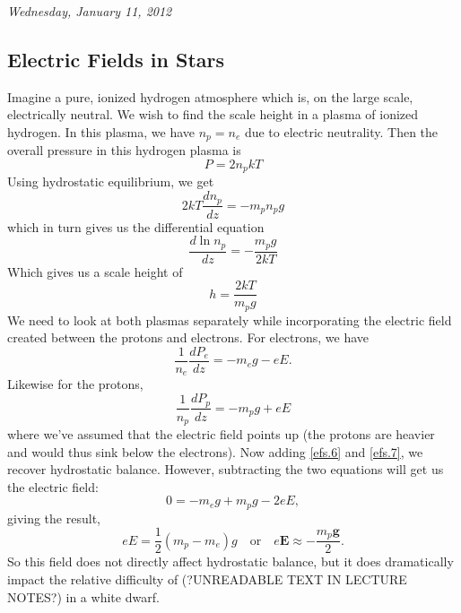\documentclass[10pt]{article}
\numberwithin{equation}{section}
\newcommand{\n}{\noindent}
\begin{document}
	\n \textit{Wednesday, January 11, 2012}
	\subsection{Electric Fields in Stars}
	Imagine a pure, ionized hydrogen atmosphere which is, on the large scale, electrically neutral. We wish to find the scale height in a plasma of ionized hydrogen. In this plasma, we have $n_p=n_e$ due to electric neutrality. Then the overall pressure in this hydrogen plasma is
	\begin{equation}
		\label{efs.2} P=2n_pkT
	\end{equation}
	Using hydrostatic equilibrium, we get
	\begin{equation}
		\label{efs.3} 2kT\frac{dn_p}{dz}=-m_pn_pg
	\end{equation}
	which in turn gives us the differential equation
	\begin{equation}
		\label{efs.4} \frac{d\ln n_p}{dz}=-\frac{m_pg}{2kT}
	\end{equation}
	Which gives us a scale height of
	\begin{equation}
		\label{efs.5} h=\frac{2kT}{m_pg}
	\end{equation}
	We need to look at both plasmas separately while incorporating the electric field created between the protons and electrons. For electrons, we have
	\begin{equation}
		\label{efs.6} \frac{1}{n_e}\frac{dP_e}{dz}=-m_eg-eE.
	\end{equation}
	Likewise for the protons,
	\begin{equation}
		\label{efs.7} \frac{1}{n_p}\frac{dP_p}{dz}=-m_pg+eE
	\end{equation}
	where we've assumed that the electric field points up (the protons are heavier and would thus sink below the electrons). Now adding \eqref{efs.6} and \eqref{efs.7}, we recover hydrostatic balance. However, subtracting the two equations will get us the electric field:
	\begin{equation}
		\label{efs.8} 0=-m_eg+m_pg-2eE,
	\end{equation}
	giving the result,
	\begin{equation}
		\label{efs.9} eE=\frac{1}{2}\left(m_p-m_e\right)g \quad \textrm{or}\quad e\mathbf{E}\approx -\frac{m_p\mathbf{g}}{2}.
	\end{equation}
	So this field does not directly affect hydrostatic balance, but it does dramatically impact the relative difficulty of (?UNREADABLE TEXT IN LECTURE NOTES?) in a white dwarf.
\end{document}
